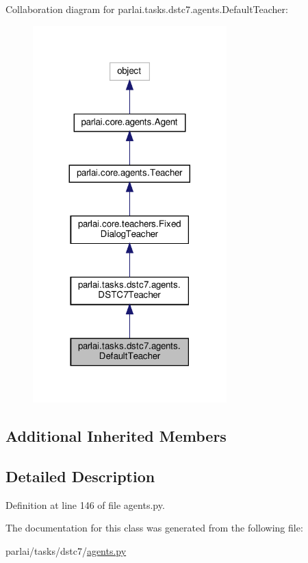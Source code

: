 Collaboration diagram for parlai.\+tasks.\+dstc7.\+agents.\+Default\+Teacher\+:
\nopagebreak
\begin{figure}[H]
\begin{center}
\leavevmode
\includegraphics[width=212pt]{classparlai_1_1tasks_1_1dstc7_1_1agents_1_1DefaultTeacher__coll__graph}
\end{center}
\end{figure}
\subsection*{Additional Inherited Members}


\subsection{Detailed Description}


Definition at line 146 of file agents.\+py.



The documentation for this class was generated from the following file\+:\begin{DoxyCompactItemize}
\item 
parlai/tasks/dstc7/\hyperlink{parlai_2tasks_2dstc7_2agents_8py}{agents.\+py}\end{DoxyCompactItemize}
